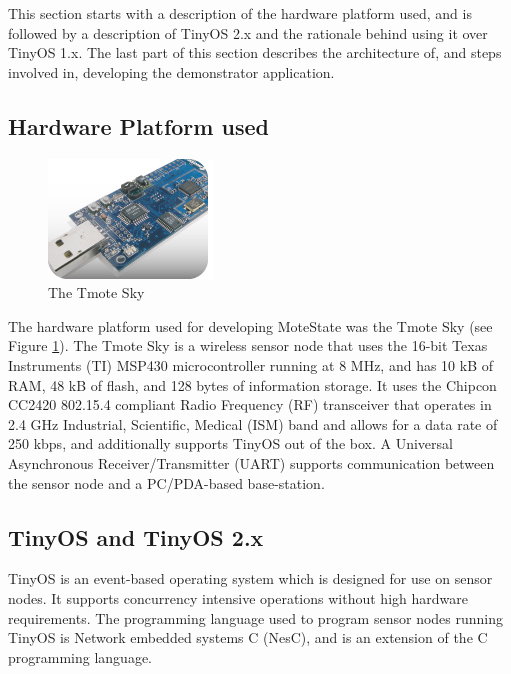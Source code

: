 \documentclass{sig-alternate-10pt}
\begin{document}
This section starts with a description of the hardware platform used, and is
followed by a description of TinyOS 2.x and the rationale behind using it over
TinyOS 1.x. The last part of this section describes the architecture of, and
steps involved in, developing the demonstrator application.
 
\subsection{Hardware Platform used\\}

 \begin{figure}[h]
\centering
\includegraphics	{img/products-tmotesky-big.jpg}
\caption{The Tmote Sky} 
\label{Fig2:TmoteSky}
\end{figure} 


The hardware platform used for developing MoteState was the Tmote Sky
\cite{TmoteskyDataSheet:2007} (see Figure \ref{Fig2:TmoteSky}). The Tmote Sky
is a wireless sensor node that uses the 16-bit Texas Instruments (TI) MSP430
microcontroller running at 8 MHz, and has 10 kB of RAM, 48 kB of flash, and 128
bytes of information storage. It uses the Chipcon CC2420 802.15.4 compliant
Radio Frequency (RF) transceiver that operates in 2.4 GHz Industrial, Scientific, Medical (ISM) band and allows for a data rate of 250 kbps, and additionally supports TinyOS out of the
box. A Universal Asynchronous Receiver/Transmitter (UART) supports communication between the sensor node and a PC/PDA-based base-station.

\subsection{TinyOS and TinyOS 2.x}

TinyOS \cite{TinyOSManual:2006} is an event-based operating system which is designed for use on sensor nodes. It supports concurrency intensive operations without high hardware requirements. The programming language used to program sensor nodes running TinyOS is Network embedded systems C (NesC), and is an extension of the C programming language. 
\end{document}
